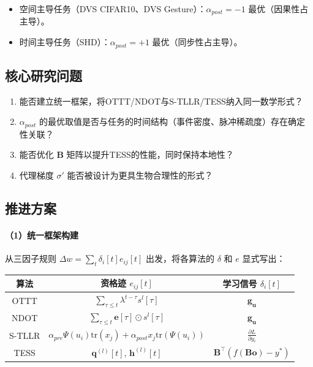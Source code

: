 \documentclass[journal,12pt,onecolumn]{IEEEtran}
\begin{document}
\begin{itemize}
    \item 空间主导任务（DVS CIFAR10、DVS Gesture）：\(\alpha_{post}=-1\) 最优（因果性占主导）。
    \item 时间主导任务（SHD）：\(\alpha_{post}=+1\) 最优（同步性占主导）。
\end{itemize}

\subsection{核心研究问题}

\begin{enumerate}
    \item 能否建立统一框架，将OTTT/NDOT与S-TLLR/TESS纳入同一数学形式？
    \item \(\alpha_{post}\) 的最优取值是否与任务的时间结构（事件密度、脉冲稀疏度）存在确定性关联？
    \item 能否优化 \(\mathbf{B}\) 矩阵以提升TESS的性能，同时保持本地性？
    \item 代理梯度 \(\sigma'\) 能否被设计为更具生物合理性的形式？
\end{enumerate}

\subsection{推进方案}

\paragraph{（1）统一框架构建}
从三因子规则 \(\Delta w = \sum_t \delta_i[t] e_{ij}[t]\) 出发，将各算法的 \(\delta\) 和 \(e\) 显式写出：

\begin{center}
\begin{tabular}{c|c|c}
\hline
算法 & 资格迹 \(e_{ij}[t]\) & 学习信号 \(\delta_i[t]\) \\
\hline
OTTT & \(\sum_{\tau \le t}\lambda^{t-\tau}s^l[\tau]\) & \(\mathbf{g}_{\mathbf{u}}\) \\
NDOT & \(\sum_{\tau \le t}\mathbf{e}[\tau]\odot s^l[\tau]\) & \(\mathbf{g}_{\mathbf{u}}\) \\
S-TLLR & \(\alpha_{pre}\Psi(u_i)\text{tr}(x_j) + \alpha_{post}x_j\text{tr}(\Psi(u_i))\) & \(\frac{\partial L}{\partial y_i}\) \\
TESS & \(\mathbf{q}^{(l)}[t]\), \(\mathbf{h}^{(l)}[t]\) & \(\mathbf{B}^\top(f(\mathbf{B}\mathbf{o}) - y^*)\) \\
\hline
\end{tabular}
\end{center}
\end{document}
